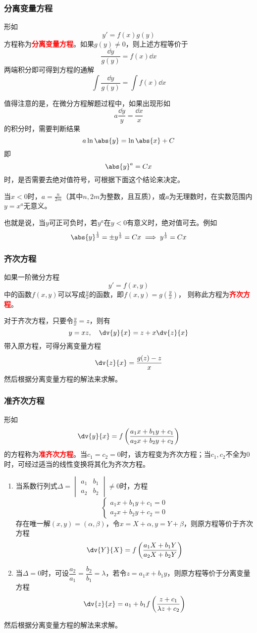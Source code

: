 \subsubsection{分离变量方程}
形如\[ y'=f(x)g(y) \]方程称为\textcolor{red}{\textbf{\textsf{分离变量方程}}}。如果$g(y)\neq 0$，则上述方程等价于
\[ \frac{\dd{y}}{g(y)} = f(x)\dd{x} \]
两端积分即可得到方程的通解
\[ \int \frac{\dd{y}}{g(y)} = \int f(x)\dd{x} \]

值得注意的是，在微分方程解题过程中，如果出现形如
\[ a\frac{\dd{y}}{y} = \frac{\dd{x}}{x} \]
的积分时，需要判断结果
\[ a\ln\abs{y} = \ln\abs{x}+C \]
即
\[ \abs{y}^a = Cx \]
时，是否需要去绝对值符号，可根据下面这个结论来决定。

\begin{theorem}
    当$x<0$时，$a=\frac{n}{2m}$（其中$n,2m$为整数，且互质），或$a$为无理数时，在实数范围内
    $y=x^a$无意义。
\end{theorem}

也就是说，当$y$可正可负时，若$y^a$在$y<0$有意义时，绝对值可去。例如
\[ \abs{y}^{\frac{1}{3}} = \pm y^{\frac{1}{3}} = Cx \implies y^\frac{1}{3} = Cx \]

\subsubsection{齐次方程}
如果一阶微分方程\[ y' = f(x,y) \]中的函数$f(x,y)$可以写成$\frac{y}{x}$的函数，即$f(x,y)=g(\frac{y}{x})$，
则称此方程为\textcolor{red}{\textbf{\textsf{齐次方程}}}。

对于齐次方程，只要令$\frac{y}{x}=z$，则有
\[ y=xz,\quad \dv{y}{x} = z + x\dv{z}{x} \]
带入原方程，可得分离变量方程
\[ \dv{z}{x} = \frac{g(z)-z}{x} \]
然后根据分离变量方程的解法来求解。

\subsubsection{准齐次方程}
形如
\[ \dv{y}{x} = f\left(\frac{a_1 x+ b_1 y + c_1}{a_2 x + b_2 y + c_2}\right) \]
的方程称为\textcolor{red}{\textbf{\textsf{准齐次方程}}}。当$c_1=c_2=0$时，该方程变为齐次方程；当$c_1,c_2$不全为$0$时，可经过适当的线性变换将其化为齐次方程。

\begin{enumerate}[(1)]
    \item 当系数行列式$\Delta = \begin{vmatrix}a_1 &　b_1 \\ a_2 & b_2\end{vmatrix}\neq 0$时，方程
          \[ \begin{cases}
                  a_1x + b_1y + c_1 = 0 \\
                  a_2x + b_2y + c_2 = 0
              \end{cases} \]存在唯一解$(x,y)=(\alpha,\beta)$，令$x=X+\alpha,y=Y+\beta$，则原方程等价于齐次方程
          \[ \dv{Y}{X} = f\left(\frac{a_1X +b_1Y}{a_2X + b_2Y}\right) \]
    \item 当$\Delta = 0$时，可设$\dfrac{a_2}{a_1}=\dfrac{b_2}{b_1}=\lambda$，若令$z=a_1x+b_1y$，则原方程等价于分离变量方程
          \[ \dv{z}{x} = a_1 + b_1 f\left(\frac{z+c_1}{\lambda z + c_2}\right) \]
\end{enumerate}
然后根据分离变量方程的解法来求解。


